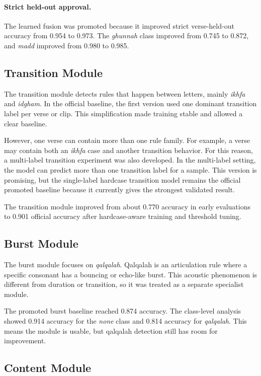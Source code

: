 \paragraph{Strict held-out approval.}
The learned fusion was promoted because it improved strict verse-held-out
accuracy from 0.954 to 0.973. The \textit{ghunnah} class improved from 0.745 to
0.872, and \textit{madd} improved from 0.980 to 0.985.

\subsection{Transition Module}

The transition module detects rules that happen between letters, mainly
\textit{ikhfa} and \textit{idgham}. In the official baseline, the first version
used one dominant transition label per verse or clip. This simplification made
training stable and allowed a clear baseline.

However, one verse can contain more than one rule family. For example, a verse
may contain both an \textit{ikhfa} case and another transition behavior. For
this reason, a multi-label transition experiment was also developed. In the
multi-label setting, the model can predict more than one transition label for a
sample. This version is promising, but the single-label hardcase transition
model remains the official promoted baseline because it currently gives the
strongest validated result.

The transition module improved from about 0.770 accuracy in early evaluations
to 0.901 official accuracy after hardcase-aware training and threshold tuning.

\subsection{Burst Module}

The burst module focuses on \textit{qalqalah}. Qalqalah is an articulation rule
where a specific consonant has a bouncing or echo-like burst. This acoustic
phenomenon is different from duration or transition, so it was treated as a
separate specialist module.

The promoted burst baseline reached 0.874 accuracy. The class-level analysis
showed 0.914 accuracy for the \textit{none} class and 0.814 accuracy for
\textit{qalqalah}. This means the module is usable, but qalqalah detection still
has room for improvement.

\subsection{Content Module}

